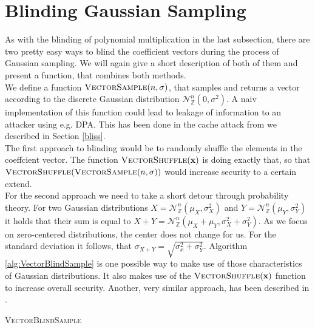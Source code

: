 \section{Blinding Gaussian Sampling}
As with the blinding of polynomial multiplication in the last subsection, there are two pretty easy ways to blind the coefficient vectors during the process of Gaussian sampling. We will again give a short description of both of them and present a function, that combines both methods.\\
We define a function \(\textsc{VectorSample}(n,\sigma)\), that samples and returns a vector according to the discrete Gaussian distribution \(\mathcal{N}_\mathbb{Z}^{n} (0, \sigma^2)\). A naiv implementation of this function could lead to leakage of information to an attacker using e.g. DPA. This has been done in the cache attack from \cite{cryptoeprint:2016:300} we described in Section \ref{bliss}.\\
The first approach to blinding would be to randomly shuffle the elements in the coeffcient vector. The function \(\textsc{VectorShuffle}(\textbf{x})\) is doing exactly that, so that \(\textsc{VectorShuffle}(\textsc{VectorSample}(n,\sigma))\) would increase security to a certain extend.\\
For the second approach we need to take a short detour through probability theory. For two Gaussian distributions \(X=\mathcal{N}_\mathbb{Z}^{n} (\mu_X, \sigma^2_X)\) and \(Y=\mathcal{N}_\mathbb{Z}^{n} (\mu_Y, \sigma^2_Y)\) it holds that their sum is equal to \(X+Y=\mathcal{N}_\mathbb{Z}^{n} (\mu_X+\mu_Y, \sigma^2_X+\sigma^2_Y)\). As we focus on zero-centered distributions, the center does not change for us. For the standard deviation it follows, that \(\sigma_{X+Y}=\sqrt{\sigma^2_x+\sigma^2_Y}\). Algorithm \ref{alg:VectorBlindSample} is one possible way to make use of those characteristics of Gaussian distributions. It also makes use of the \(\textsc{VectorShuffle}(\textbf{x})\) function to increase overall security. Another, very similar approach, has been described in \cite{cryptoeprint:2014:254}.


\begin{algorithm}
    \caption{\textsc{VectorBlindSample}}
    \label{alg:VectorBlindSample}
    \begin{algorithmic}[1]
        \EndFor\\
    \end{algorithmic}
\end{algorithm}